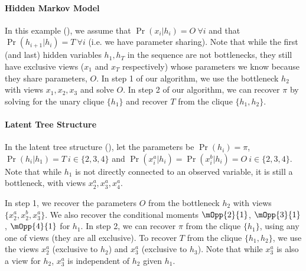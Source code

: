 \paragraph{Hidden Markov Model}

In this example (), we assume that
  $\Pr(x_i|h_i) = O  ~\forall i$  and that $\Pr(h_{i+1} | h_i)
  = T ~\forall i$ (i.e. we have parameter sharing).
Note that while the first (and last) hidden variables $h_1, h_T$ in the
  sequence are not bottlenecks, they still have exclusive views ($x_1$ and
  $x_T$ respectively) whose parameters we know because they share
  parameters, $O$.
In step 1 of our algorithm, we use the bottleneck $h_2$ with views $x_1,
  x_2, x_3$ and solve $O$.
In step 2 of our algorithm, we can recover $\pi$ by solving for the
  unary clique $\{h_1\}$ and recover $T$ from the clique $\{h_{1},
  h_{2}\}$.

\paragraph{Latent Tree Structure}

In the latent tree structure (), let the
  parameters be $\Pr(h_i) = \pi$, $\Pr(h_i | h_1) = T ~i \in \{2,3,4\}$
  and $\Pr(x^a_i | h_i) = \Pr(x^b_i | h_i) = O ~i \in \{2,3,4\}$.
Note that while $h_1$ is not directly connected to an observed variable,
  it is still a bottleneck, with views $x^a_2, x^a_3, x^a_4$.

In step 1, we recover the parameters $O$ from the bottleneck $h_2$ with
  views $\{x^a_2, x^b_2, x^a_3\}$. We also recover the conditional moments
  $\mOpp{2}{1}$, $\mOpp{3}{1}$, $\mOpp{4}{1}$ for $h_1$. 
In step 2, we can recover $\pi$ from the clique $\{h_1\}$, using any
  one of views (they are all exclusive). 
To recover $T$ from the clique $\{h_1, h_2\}$, we use the views $x^a_2$
  (exclusive to $h_2$) and $x^a_3$ (exclusive to $h_3$). Note that while
  $x^a_3$ is also a view for $h_2$, $x^a_3$ is independent of $h_2$ given
  $h_1$.

